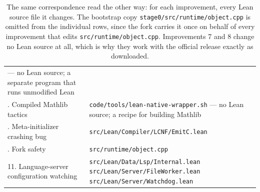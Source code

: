 \documentclass{article}
\newcommand{\Lean}{Lean\xspace}      %
\newcommand{\mathlib}{Mathlib\xspace}
\begin{document}
\begin{table}[!ht]
\begin{tabular}{@{}p{}p{}@{}}
     --- no \Lean source; a separate program that runs unmodified \Lean \\
\addlinespace
8. Compiled \mathlib tactics & \texttt{code/tools/\allowbreak lean-native-wrapper.sh} \newline
     --- no \Lean source; a recipe for building \mathlib \\
\addlinespace
9. Meta-initializer crashing bug  & \texttt{src/Lean/Compiler/LCNF/EmitC.lean} \\
\addlinespace
10. Fork safety  & \texttt{src/runtime/object.cpp} \\
\addlinespace
\raggedright 11. Language-server configuration watching  & \texttt{src/Lean/Data/Lsp/Internal.lean} \newline
     \texttt{src/Lean/Server/FileWorker.lean} \newline
     \texttt{src/Lean/Server/Watchdog.lean} \\
\bottomrule
\end{tabular}
\caption{The same correspondence read the other way: for each improvement, every \Lean source file it changes. The bootstrap copy \texttt{stage0/src/runtime/object.cpp} is omitted from the individual rows, since the fork carries it once on behalf of every improvement that edits \texttt{src/runtime/object.cpp}. Improvements 7 and 8 change no \Lean source at all, which is why they work with the official release exactly as downloaded.}
\label{tab:improvement-to-file}
\end{table}

\clearpage
\end{document}
